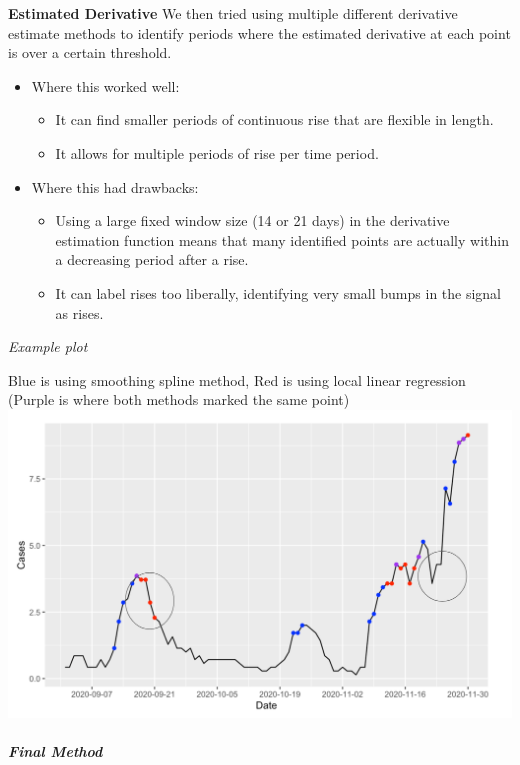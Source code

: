 \documentclass[]{article}
\providecommand{\tightlist}{%
  \setlength{\itemsep}{0pt}\setlength{\parskip}{0pt}}
\let\oldsubparagraph\subparagraph
\renewcommand{\subparagraph}[1]{\oldsubparagraph{#1}\mbox{}}
\begin{document}
\textbf{Estimated Derivative} We then tried using multiple different
derivative estimate methods to identify periods where the estimated
derivative at each point is over a certain threshold.

\begin{itemize}
\tightlist
\item
  Where this worked well:

  \begin{itemize}
  \tightlist
  \item
    It can find smaller periods of continuous rise that are flexible in
    length.
  \item
    It allows for multiple periods of rise per time period.
  \end{itemize}
\item
  Where this had drawbacks:

  \begin{itemize}
  \tightlist
  \item
    Using a large fixed window size (14 or 21 days) in the derivative
    estimation function means that many identified points are actually
    within a decreasing period after a rise.
  \item
    It can label rises too liberally, identifying very small bumps in
    the signal as rises.
  \end{itemize}
\end{itemize}

\emph{Example plot}

Blue is using smoothing spline method, Red is using local linear
regression (Purple is where both methods marked the same point)
\includegraphics{estimated_deriv.png}

\hypertarget{final-method}{%
\subparagraph{\texorpdfstring{\textbf{Final
Method}}{Final Method}}\label{final-method}}
\end{document}
